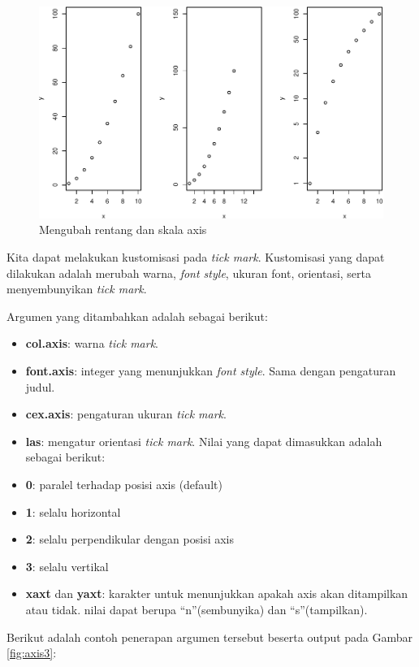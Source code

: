 \documentclass[]{book}
\begin{document}
\begin{figure}

{\centering \includegraphics[width=0.8\linewidth]{EnvStat_files/figure-latex/axis2-1} 

}

\caption{Mengubah rentang dan skala axis}\label{fig:axis2}
\end{figure}

Kita dapat melakukan kustomisasi pada \emph{tick mark}. Kustomisasi yang
dapat dilakukan adalah merubah warna, \emph{font style}, ukuran font,
orientasi, serta menyembunyikan \emph{tick mark}.

Argumen yang ditambahkan adalah sebagai berikut:

\begin{itemize}
\item
  \textbf{col.axis}: warna \emph{tick mark}.
\item
  \textbf{font.axis}: integer yang menunjukkan \emph{font style}. Sama
  dengan pengaturan judul.
\item
  \textbf{cex.axis}: pengaturan ukuran \emph{tick mark}.
\item
  \textbf{las}: mengatur orientasi \emph{tick mark}. Nilai yang dapat
  dimasukkan adalah sebagai berikut:
\item
  \textbf{0}: paralel terhadap posisi axis (default)
\item
  \textbf{1}: selalu horizontal
\item
  \textbf{2}: selalu perpendikular dengan posisi axis
\item
  \textbf{3}: selalu vertikal
\item
  \textbf{xaxt} dan \textbf{yaxt}: karakter untuk menunjukkan apakah
  axis akan ditampilkan atau tidak. nilai dapat berupa ``n''(sembunyika)
  dan ``s''(tampilkan).
\end{itemize}

Berikut adalah contoh penerapan argumen tersebut beserta output pada
Gambar \ref{fig:axis3}:
\end{document}
